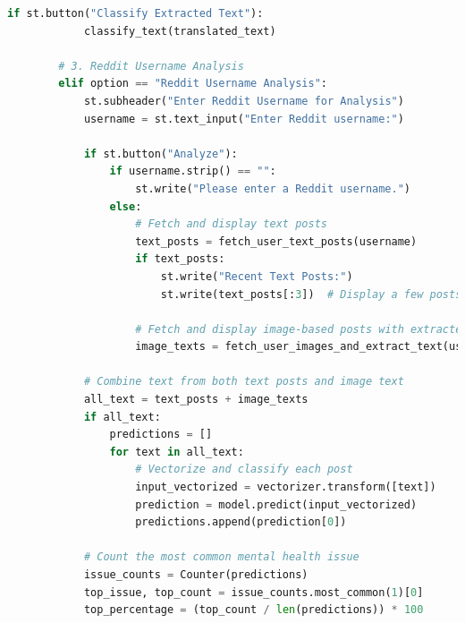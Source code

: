    \begin{tcolorbox}[colback=gray!5!white, colframe=gray!80!black, boxrule=0.5pt, title=Main Streamlit Application Logic]
        \begin{lstlisting}[language=Python]
        if st.button("Classify Extracted Text"):
            classify_text(translated_text)
        
        # 3. Reddit Username Analysis
        elif option == "Reddit Username Analysis":
            st.subheader("Enter Reddit Username for Analysis")
            username = st.text_input("Enter Reddit username:")
        
            if st.button("Analyze"):
                if username.strip() == "":
                    st.write("Please enter a Reddit username.")
                else:
                    # Fetch and display text posts
                    text_posts = fetch_user_text_posts(username)
                    if text_posts:
                        st.write("Recent Text Posts:")
                        st.write(text_posts[:3])  # Display a few posts for review
        
                    # Fetch and display image-based posts with extracted text
                    image_texts = fetch_user_images_and_extract_text(username)

            # Combine text from both text posts and image text
            all_text = text_posts + image_texts
            if all_text:
                predictions = []
                for text in all_text:
                    # Vectorize and classify each post
                    input_vectorized = vectorizer.transform([text])
                    prediction = model.predict(input_vectorized)
                    predictions.append(prediction[0])
            
            # Count the most common mental health issue
            issue_counts = Counter(predictions)
            top_issue, top_count = issue_counts.most_common(1)[0]
            top_percentage = (top_count / len(predictions)) * 100
                \end{lstlisting}
            \end{tcolorbox}

